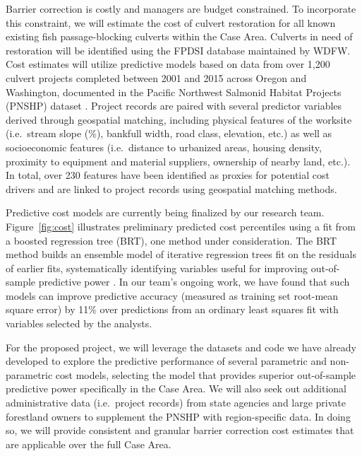 Barrier correction is costly and managers are budget constrained. To incorporate this constraint, we will estimate the cost of culvert restoration for all known existing fish passage-blocking culverts within the Case Area. Culverts in need of restoration will be identified using the FPDSI database maintained by WDFW. Cost estimates will utilize predictive models based on data from over 1,200 culvert projects completed between 2001 and 2015 across Oregon and Washington, documented in the Pacific Northwest Salmonid Habitat Projects (PNSHP) dataset \citep{katz_freshwater_2007, noauthor_pacific_2021}. Project records are paired with several predictor variables derived through geospatial matching, including physical features of the worksite (i.e.\ stream slope (\%), bankfull width, road class, elevation, etc.) as well as socioeconomic features (i.e.\ distance to urbanized areas, housing density, proximity to equipment and material suppliers, ownership of nearby land, etc.). In total, over 230 features have been identified as proxies for potential cost drivers and are linked to project records using geospatial matching methods. 

Predictive cost models are currently being finalized by our research team. Figure~\ref{fig:cost} illustrates preliminary predicted cost percentiles using a fit from a boosted regression tree (BRT), one method under consideration. The BRT method builds an ensemble model of iterative regression trees fit on the residuals of earlier fits, systematically identifying variables useful for improving out-of-sample predictive power \citep{elith_working_2008}. In our team's ongoing work, we have found that such models can improve predictive accuracy (measured as training set root-mean square error) by 11\% over predictions from an ordinary least squares fit with variables selected by the analysts. 

For the proposed project, we will leverage the datasets and code we have already developed to explore the predictive performance of several parametric and non-parametric cost models, selecting the model that provides superior out-of-sample predictive power specifically in the Case Area. We will also seek out additional administrative data (i.e.\ project records) from state agencies and large private forestland owners to supplement the PNSHP with region-specific data. In doing so, we will provide consistent and granular barrier correction cost estimates that are applicable over the full Case Area. 

